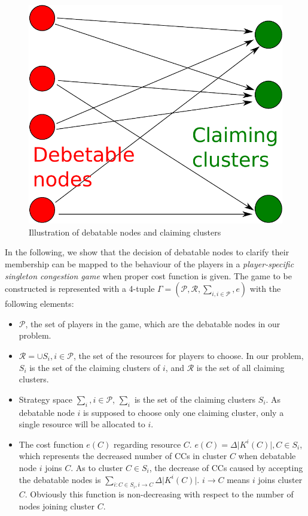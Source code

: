\documentclass[times]{ettauth}
\theoremstyle{mytheoremstyle}
\theoremstyle{mytheoremstyle}
\theoremstyle{mytheoremstyle}
\begin{document}
\begin{figure}[ht!]
  \centering
  \includegraphics[width=0.37\linewidth]{singletongame_matching.pdf}
  \caption{Illustration of debatable nodes and claiming clusters}
  \label{debatable_nodes_claiming_cluster}
\end{figure}


In the following, we show that the decision of debatable nodes to clarify their membership can be mapped to the behaviour of the players in a \textit{player-specific singleton congestion game} when proper cost function is given.
The game to be constructed is represented with a 4-tuple $\Gamma=(\mathcal{P},\mathcal{R},\sum_{i, i \in \mathcal{P}}, e)$ with the following elements:

\begin{itemize}
	\item $\mathcal{P}$, the set of players in the game, which are the debatable nodes in our problem.
	\item $\mathcal{R} = \cup S_i, i\in \mathcal{P}$, the set of the resources for players to choose. In our problem, $S_i$ is the set of the claiming clusters of $i$, and $\mathcal{R}$ is the set of all claiming clusters.
	\item Strategy space $\sum_i, i \in \mathcal{P}$, $\sum_i$ is the set of the claiming clusters $S_i$.
	As debatable node $i$ is supposed to choose only one claiming cluster, only a single resource will be allocated to $i$.%
	\item 	The cost function $e(C)$ regarding resource $C$. 
	$e(C) = \Delta\vert K^i(C)|, C\in S_i$, which represents the decreased number of CCs in cluster $C$ when debatable node $i$ joins $C$.
	As to cluster $C\in S_i$, the decrease of CCs caused by accepting the debatable nodes is $\sum_{i:C\in S_i, i\rightarrow C} \Delta\vert K^i(C) \vert$. 
$i\rightarrow C$ means $i$ joins cluster $C$.
Obviously this function is non-decreasing with respect to the number of nodes joining cluster $C$.
\end{itemize}
	
\end{document}
